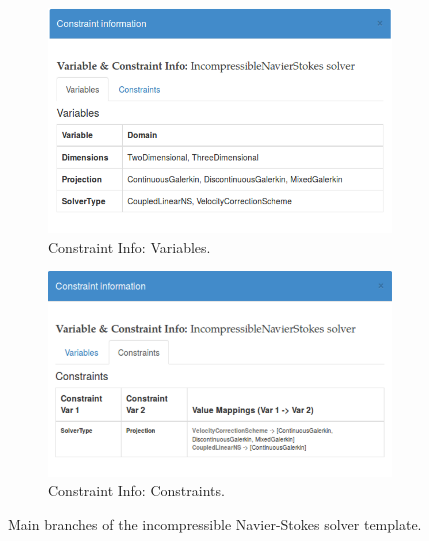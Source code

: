 \documentclass[11pt, a4paper]{report}
\begin{document}
\begin{figure}[htb!]
 \centering
 
 \label{fig:constraints_mapping}
\end{figure}

\begin{figure}[!htb]
\centering
\begin{subfigure}{.5\textwidth}
  \centering
  \includegraphics[width=.9\linewidth]{constraint_info}
  \caption{Constraint Info: Variables.}
  \label{fig:constraint_info}
\end{subfigure}%
\begin{subfigure}{.5\textwidth}
  \centering
  \includegraphics[width=.975\linewidth]{constraint_info_2}
  \caption{Constraint Info: Constraints.}
  \label{fig:constraint_info_2}
\end{subfigure}
\caption{Main branches of the incompressible Navier-Stokes solver template.}
\label{fig:constrain}
\end{figure}
\end{document}
